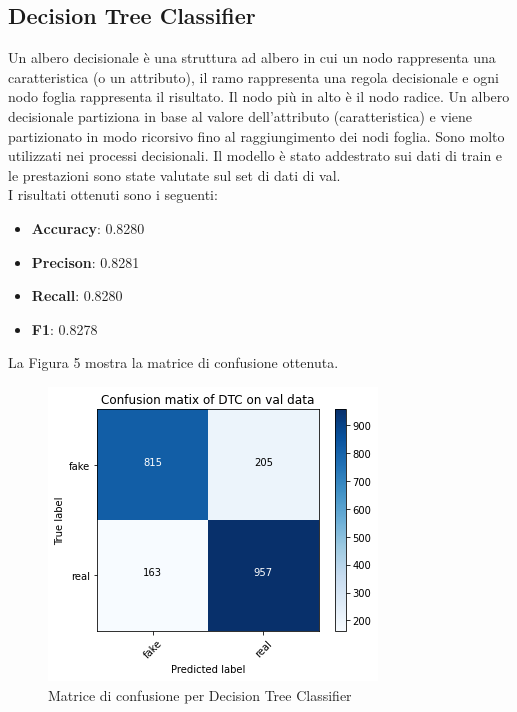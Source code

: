 \documentclass{article}
\begin{document}
\subsection{Decision Tree Classifier}
Un albero decisionale è una struttura ad albero in cui un nodo rappresenta una caratteristica (o un attributo), il ramo rappresenta una regola decisionale e ogni nodo foglia rappresenta il risultato. Il nodo più in alto è il nodo radice. Un albero decisionale partiziona in base al valore dell'attributo (caratteristica) e viene partizionato in modo ricorsivo fino al raggiungimento dei nodi foglia. Sono molto utilizzati nei processi decisionali. Il modello è stato addestrato sui dati di train e le prestazioni sono state valutate sul set di dati di val. \\
I risultati ottenuti sono i seguenti:
\begin{itemize}[noitemsep]
  \item \textbf{Accuracy}: 0.8280
  \item \textbf{Precison}: 0.8281
  \item \textbf{Recall}: 0.8280
  \item \textbf{F1}: 0.8278
 \end{itemize}

\newpage
\noindent
La Figura 5 mostra la matrice di confusione ottenuta.
\begin{figure}[H]
\includegraphics[width=0.5\linewidth]{DTC.png}
\centering
\caption{Matrice di confusione per Decision Tree Classifier}
\label{fig:bytepost}
\end{figure}
\end{document}
